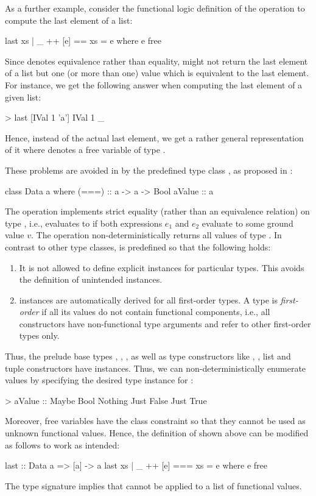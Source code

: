 As a further example, consider the functional logic definition
of the operation  to compute the last element of a list:
%
\begin{curry}
last xs | _ ++ [e] == xs = e
  where e free
\end{curry}
%
Since \ccode{==} denotes equivalence rather than equality,
 might not return the last element of a list
but one (or more than one) value which is equivalent to the
last element.
For instance, we get the following answer when computing the last element
of a given  list:
%
\begin{curry}
> last [IVal 1 'a']
IVal 1 _
\end{curry}
%
Hence, instead of the actual last element, we get a rather general
representation of it where \ccode{\us} denotes a free variable
of type .

These problems are avoided in \CYS by the predefined type class ,
as proposed in \cite{HanusTeegen20}:
%
\begin{curry}
class Data a where
  (===)  :: a -> a -> Bool
  aValue :: a
\end{curry}
%
The operation \ccode{===} implements strict equality
(rather than an equivalence relation) on type ,
i.e.,  evaluates to 
if both expressions $e_1$ and $e_2$ evaluate to some ground value $v$.
The operation  non-deterministically returns
all values of type .
In contrast to other type classes,  is predefined
so that the following holds:
%
\begin{enumerate}
\item
It is not allowed to define explicit  instances
for particular types. This avoids the definition of unintended instances.
\item
{} instances are automatically derived
for all first-order types.
A type is \emph{first-order} if all its values
do not contain functional components,
i.e., all constructors have non-functional type arguments and
refer to other first-order types only.
\end{enumerate}
%
Thus, the prelude base types , , ,
 as well as type constructors like
, , list and tuple constructors
have  instances.
Thus, we can non-deterministically enumerate values
by specifying the desired type instance for :
%
\begin{curry}
> aValue :: Maybe Bool
Nothing
Just False
Just True
\end{curry}
%
Moreover, free variables have the class constraint 
so that they cannot be used as unknown functional values.
Hence, the definition of  shown above
can be modified as follows to work as intended:
%
\begin{curry}
last :: Data a => [a] -> a
last xs | _ ++ [e] === xs = e
  where e free
\end{curry}
%
The type signature implies that  cannot be applied
to a list of functional values.

